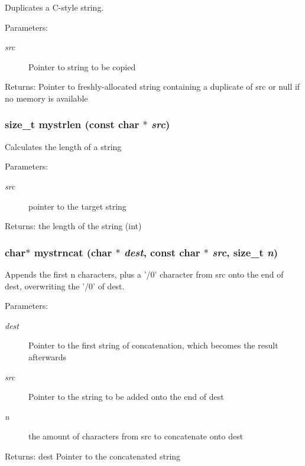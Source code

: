 Duplicates a C-style string. \begin{Desc}
\item[Parameters:]
\begin{description}
\item[{\em src}]Pointer to string to be copied \end{description}
\end{Desc}
\begin{Desc}
\item[Returns:]Pointer to freshly-allocated string containing a duplicate of src or null if no memory is available \end{Desc}
\subsubsection{\setlength{\rightskip}{0pt plus 5cm}size\_\-t mystrlen (const char $\ast$ {\em src})}\label{mystring_8c_eb723b75f0ec2e593259bd9e6a0837bb}


Calculates the length of a string \begin{Desc}
\item[Parameters:]
\begin{description}
\item[{\em src}]pointer to the target string \end{description}
\end{Desc}
\begin{Desc}
\item[Returns:]the length of the string (int) \end{Desc}
\subsubsection{\setlength{\rightskip}{0pt plus 5cm}char$\ast$ mystrncat (char $\ast$ {\em dest}, const char $\ast$ {\em src}, size\_\-t {\em n})}\label{mystring_8c_36e5091b981e9da826d41e7977b8e507}


Appends the first n characters, plus a '/0' character from src onto the end of dest, overwriting the '/0' of dest. \begin{Desc}
\item[Parameters:]
\begin{description}
\item[{\em dest}]Pointer to the first string of concatenation, which becomes the result afterwards \item[{\em src}]Pointer to the string to be added onto the end of dest \item[{\em n}]the amount of characters from src to concatenate onto dest \end{description}
\end{Desc}
\begin{Desc}
\item[Returns:]dest Pointer to the concatenated string \end{Desc}
